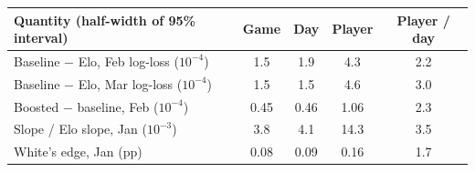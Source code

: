 \begin{tabular}{lcccc}
\toprule
Quantity (half-width of 95\% interval) & Game & Day & Player & Player / day \\
\midrule
Baseline $-$ Elo, Feb log-loss ($10^{-4}$) & 1.5 & 1.9 & 4.3 & 2.2 \\
Baseline $-$ Elo, Mar log-loss ($10^{-4}$) & 1.5 & 1.5 & 4.6 & 3.0 \\
Boosted $-$ baseline, Feb ($10^{-4}$) & 0.45 & 0.46 & 1.06 & 2.3 \\
Slope / Elo slope, Jan ($10^{-3}$) & 3.8 & 4.1 & 14.3 & 3.5 \\
White's edge, Jan (pp) & 0.08 & 0.09 & 0.16 & 1.7 \\
\bottomrule
\end{tabular}
